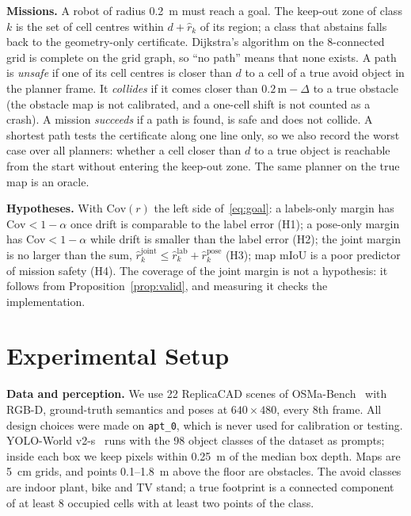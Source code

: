 \documentclass[conference]{IEEEtran}
\theoremstyle{definition}
\begin{document}
\textbf{Missions.} A robot of radius 0.2~m must reach a goal. The keep-out zone of class $k$ is the set of cell centres
within $d + \hat r_k$ of its region; a class that abstains falls back to the geometry-only certificate. Dijkstra's
algorithm on the 8-connected grid is complete on the grid graph, so ``no path'' means that none exists. A path is
\emph{unsafe} if one of its cell centres is closer than $d$ to a cell of a true avoid object in the planner frame. It
\emph{collides} if it comes closer than $0.2\,\mathrm{m} - \Delta$ to a true obstacle (the obstacle map is not
calibrated, and a one-cell shift is not counted as a crash). A mission \emph{succeeds} if a path is found, is safe and
does not collide. A shortest path tests the certificate along one line only, so we also record the worst case over all
planners: whether a cell closer than $d$ to a true object is reachable from the start without entering the keep-out
zone. The same planner on the true map is an oracle.

\textbf{Hypotheses.} With $\mathrm{Cov}(r)$ the left side of~\eqref{eq:goal}: a labels-only margin has
$\mathrm{Cov} < 1 - \alpha$ once drift is comparable to the label error (H1); a pose-only margin has
$\mathrm{Cov} < 1 - \alpha$ while drift is smaller than the label error (H2); the joint margin is no larger than the sum,
$\hat r^{\mathrm{joint}}_k \le \hat r^{\mathrm{lab}}_k + \hat r^{\mathrm{pose}}_k$ (H3); map mIoU is a poor predictor of
mission safety (H4). The coverage of the joint margin is not a hypothesis: it follows from
Proposition~\ref{prop:valid}, and measuring it checks the implementation.

\section{Experimental Setup}

\textbf{Data and perception.} We use 22 ReplicaCAD scenes of OSMa-Bench~\cite{osmabench,habitat2} with RGB-D,
ground-truth semantics and poses at $640\times480$, every 8th frame. All design choices were made on \texttt{apt\_0},
which is never used for calibration or testing. YOLO-World v2-s~\cite{yoloworld} runs with the 98 object classes of the
dataset as prompts; inside each box we keep pixels within 0.25~m of the median box depth. Maps are 5~cm grids, and points
0.1--1.8~m above the floor are obstacles. The avoid classes are indoor plant, bike and TV stand; a true footprint is a
connected component of at least 8 occupied cells with at least two points of the class.
\end{document}
